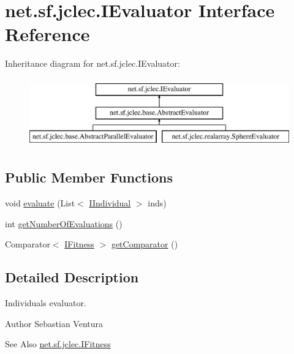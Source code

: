 \hypertarget{interfacenet_1_1sf_1_1jclec_1_1_i_evaluator}{\section{net.\-sf.\-jclec.\-I\-Evaluator Interface Reference}
\label{interfacenet_1_1sf_1_1jclec_1_1_i_evaluator}
}
Inheritance diagram for net.\-sf.\-jclec.\-I\-Evaluator\-:\begin{figure}[H]
\begin{center}
\leavevmode
\includegraphics[height=3.000000cm]{interfacenet_1_1sf_1_1jclec_1_1_i_evaluator}
\end{center}
\end{figure}
\subsection*{Public Member Functions}
\begin{DoxyCompactItemize}
\item 
void \hyperlink{interfacenet_1_1sf_1_1jclec_1_1_i_evaluator_a6a64b0d69f99da5be8a6c5b01c7752c2}{evaluate} (List$<$ \hyperlink{interfacenet_1_1sf_1_1jclec_1_1_i_individual}{I\-Individual} $>$ inds)
\item 
int \hyperlink{interfacenet_1_1sf_1_1jclec_1_1_i_evaluator_a16f44ac81b7f59147da746461ab66f1c}{get\-Number\-Of\-Evaluations} ()
\item 
Comparator$<$ \hyperlink{interfacenet_1_1sf_1_1jclec_1_1_i_fitness}{I\-Fitness} $>$ \hyperlink{interfacenet_1_1sf_1_1jclec_1_1_i_evaluator_abb2c06f5383c5aa605561d942305b168}{get\-Comparator} ()
\end{DoxyCompactItemize}


\subsection{Detailed Description}
Individuals evaluator.

\begin{DoxyAuthor}{Author}
Sebastian Ventura
\end{DoxyAuthor}
\begin{DoxySeeAlso}{See Also}
\hyperlink{interfacenet_1_1sf_1_1jclec_1_1_i_fitness}{net.\-sf.\-jclec.\-I\-Fitness} 
\end{DoxySeeAlso}


